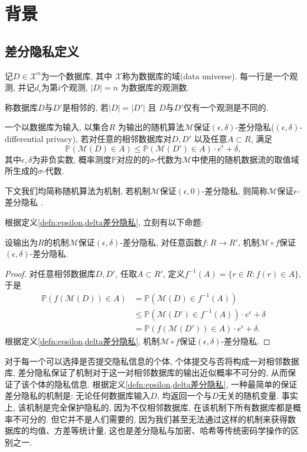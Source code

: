 \chapter{背景} %
\label{cha:背景}
\section{差分隐私定义} %
\label{sec:差分隐私定义}
记$D\in \mathcal{X}^n$为一个数据库, 其中 $\mathcal{X}$称为数据库的域(data universe). 每一行是一个观测, 并记$d_i$为第$i$个观测, $|D| = n$ 为数据库的观测数.
\begin{defn}[相邻数据库]\label{defn:相邻数据库}
  称数据库$D$与$D'$是相邻的, 若$|D| = |D'|$ 且 $D$与$D'$仅有一个观测是不同的.
\end{defn}
\begin{defn}\label{defn:epsilon,delta差分隐私}
  一个以数据库为输入, 以集合$R$ 为输出的随机算法$\mathcal M$保证$(\epsilon, \delta)$-差分隐私($(\epsilon, \delta)$-differential privacy), 若对任意的相邻数据库对$D, D'$ 以及任意$A\subset R$, 满足
  \[
  \mathbb P(\mathcal M(D)\in A) \le \mathbb P(\mathcal M(D')\in A)\cdot e^\epsilon + \delta,
  \]
  其中$\epsilon, \delta$为非负实数, 概率测度$\mathbb P$对应的的$\sigma$-代数为$\mathcal{M}$中使用的随机数据流的取值域所生成的$\sigma$-代数.
\end{defn}
下文我们均简称随机算法为机制, 若机制$\mathcal M$保证$(\epsilon, 0)$-差分隐私, 则简称$\mathcal M$保证$\epsilon$-差分隐私 \parencite{dwork_calibrating_2006}. 

根据定义\ref{defn:epsilon,delta差分隐私}, 立刻有以下命题:
\begin{prop}[后处理隐私不变]\label{prop:后处理隐私不变}
  设输出为$R$的机制$\mathcal{M}$保证$(\epsilon, \delta)$-差分隐私, 对任意函数$f\colon R\to R'$, 机制$\mathcal{M}\circ f$保证$(\epsilon, \delta)$-差分隐私.
\end{prop}
\begin{proof}
  对任意相邻数据库$D, D'$, 任取$A\subset R'$, 定义$f^{-1}(A) = \{ r\in R\colon f(r)\in A\}$, 于是
  \begin{align*}
    \mathbb P(f(\mathcal{M}(D)) \in A) &= \mathbb P(\mathcal{M}(D) \in f^{-1}(A)) \\
    &\le \mathbb P(\mathcal M(D')\in f^{-1}(A))\cdot e^\epsilon + \delta \\
    &= \mathbb P(f(\mathcal M(D'))\in A)\cdot e^\epsilon + \delta.
  \end{align*}
  根据定义\ref{defn:epsilon,delta差分隐私}, 机制$\mathcal{M}\circ f$保证$(\epsilon, \delta)$-差分隐私.
\end{proof}
对于每一个可以选择是否提交隐私信息的个体, 个体提交与否将构成一对相邻数据库, 差分隐私保证了机制对于这一对相邻数据库的输出近似概率不可分的, 从而保证了该个体的隐私信息. 根据定义\ref{defn:epsilon,delta差分隐私}, 一种最简单的保证差分隐私的机制是: 无论任何数据库输入$D$, 均返回一个与$D$无关的随机变量. 事实上, 该机制是完全保护隐私的, 因为不仅相邻数据库, 在该机制下所有数据库都是概率不可分的. 但它并不是人们需要的, 因为我们甚至无法通过这样的机制来获得数据库的均值、方差等统计量, 这也是差分隐私与加密、哈希等传统密码学操作的区别之一.

